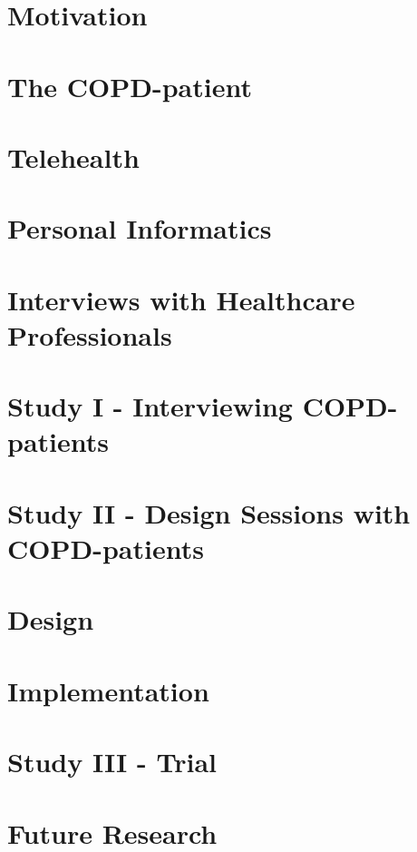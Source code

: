 
\usepackage{booktabs} %


\cleardoublepage
\cleardoublepage

\cleardoublepage

\begin{KeepFromToc}
	\tableofcontents
\end{KeepFromToc}

\chapter{Motivation}


\chapter{The COPD-patient}


\chapter{Telehealth}




\chapter{Personal Informatics}



\chapter{Interviews with Healthcare Professionals}

\chapter{Study I - Interviewing COPD-patients} 

\chapter{Study II - Design Sessions with COPD-patients}

\chapter{Design}

\chapter{Implementation}

\chapter{Study III - Trial}

\chapter{Future Research}


\label{lastpage}


